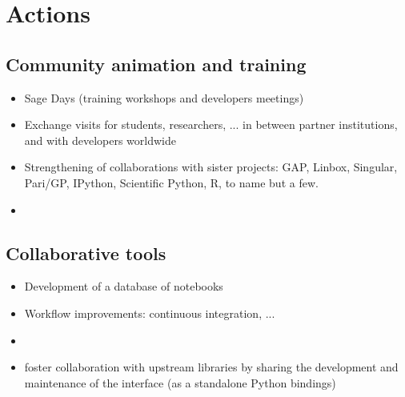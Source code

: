 \section{Actions}


\subsection{Community animation and training}

\begin{itemize}
\item Sage Days (training workshops and developers meetings)
\item Exchange visits for students, researchers, ... in between
  partner institutions, and with developers worldwide
\item Strengthening of collaborations with sister projects: GAP,
  Linbox, Singular, Pari/GP, IPython, Scientific Python, R, to name but a
  few.
\item {}
\end{itemize}

\subsection{Collaborative tools}

\begin{itemize}
\item Development of a database of notebooks 
\item Workflow improvements: continuous integration, ...
\item {}
\item foster collaboration with upstream libraries by sharing the development
  and maintenance of the interface (as a standalone Python bindings)
\end{itemize}


